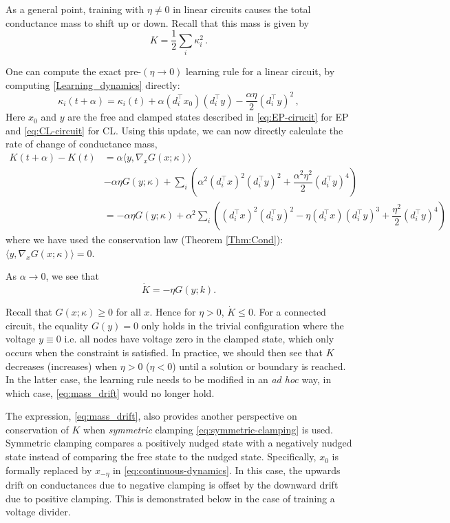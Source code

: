 \documentclass[final, 11pt, nonatbib]{elsarticle}
\theoremstyle{definition}
\theoremstyle{plain}
\numberwithin{equation}{section}
\begin{document}
As a general point, training with $\eta \neq 0$ in linear circuits causes the total conductance mass to shift up or down. Recall that this mass is given by
\[
K = \frac{1}{2}\sum_i \kappa_i^2\,.
\]

One can compute the exact pre-$(\eta \to 0)$ learning rule for a linear circuit, by computing \eqref{Learning_dynamics} directly:
\[
\kappa_{i}(t+\alpha) =\kappa_{i}(t) +  \alpha (d_i^\top x_0) (d_i^\top y) - \frac{\alpha \eta}{2}(d_i^\top y)^2\,,
\]
Here $x_0$ and $y$ are the free and clamped states described in \eqref{eq:EP-cirucit} for EP and \eqref{eq:CL-circuit} for CL. Using this update, we can now directly calculate the rate of change of conductance mass,
\begin{equation}\label{eq:mass_drift_discrete}
\begin{aligned}
K(t+\alpha) - K(t) &= \alpha \langle y, \nabla_xG(x;\kappa) \rangle  
\\
&- \alpha\eta G(y;\kappa)+ \sum_i\left(\alpha^2(d_i^\top x)^2(d_i^\top y)^2 +\dfrac{\alpha^2\eta^2}{2}(d_i^\top y)^4\right)
\\
&=- \alpha\eta G(y;\kappa)+ \alpha^2\sum_i\left((d_i^\top x)^2(d_i^\top y)^2 - \eta (d_i^\top x)(d_i^\top y)^3+\dfrac{\eta^2}{2}(d_i^\top y )^4\right)
\end{aligned}
\end{equation}
where we have used the conservation law (Theorem \ref{Thm:Cond}): $\langle y, \nabla_xG(x;\kappa) \rangle =0$.  

As $\alpha \to 0$, we see that 
\begin{equation}\label{eq:mass_drift}
\dot{K} = - \eta G(y;k).
\end{equation}

Recall that $G(x;\kappa) \geq 0$ for all $x$. Hence for $\eta > 0$, $\dot{K} \leq 0$. For a connected circuit, the equality $G(y) = 0$ only holds in the trivial configuration where the voltage $y\equiv 0$ i.e. all nodes have voltage zero in the clamped state, which only occurs when the constraint is satisfied. In practice, we should then see that $K$ decreases (increases) when $\eta > 0$ ($\eta < 0$) until a solution or boundary is reached. In the latter case, the learning rule needs to be modified in an \textit{ad hoc} way, in which case, \eqref{eq:mass_drift} would no longer hold. 

The expression, \eqref{eq:mass_drift},  also provides another perspective on conservation of $K$ when\textit{ symmetric} clamping \eqref{eq:symmetric-clamping} is used. Symmetric clamping compares a positively nudged state with a negatively nudged state instead of comparing the free state to the nudged state. Specifically, $x_0$ is formally replaced by $x_{-\eta}$ in \eqref{eq:continuous-dynamics}.
In this case, the upwards drift on conductances due to negative clamping is offset by the downward drift due to positive clamping. This is demonstrated below in the case of training a voltage divider.
\end{document}
